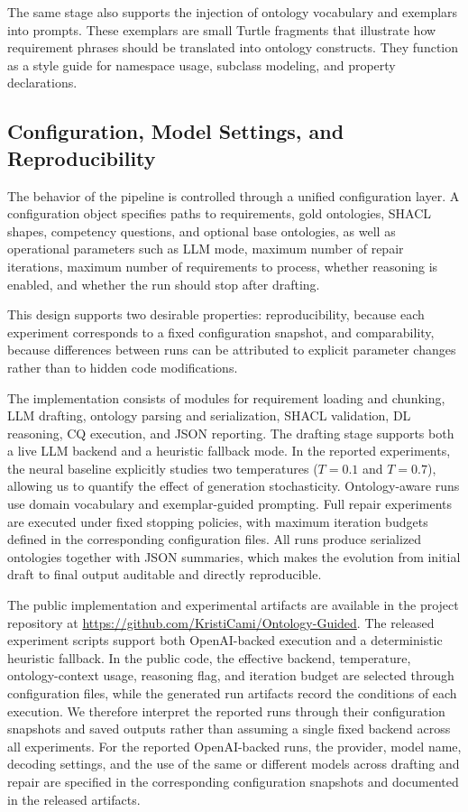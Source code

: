 The same stage also supports the injection of ontology vocabulary and exemplars into prompts. These exemplars are small Turtle fragments that illustrate how requirement phrases should be translated into ontology constructs. They function as a style guide for namespace usage, subclass modeling, and property declarations.

\subsection{Configuration, Model Settings, and Reproducibility}
The behavior of the pipeline is controlled through a unified configuration layer. A configuration object specifies paths to requirements, gold ontologies, SHACL shapes, competency questions, and optional base ontologies, as well as operational parameters such as LLM mode, maximum number of repair iterations, maximum number of requirements to process, whether reasoning is enabled, and whether the run should stop after drafting.

This design supports two desirable properties: reproducibility, because each experiment corresponds to a fixed configuration snapshot, and comparability, because differences between runs can be attributed to explicit parameter changes rather than to hidden code modifications.

The implementation consists of modules for requirement loading and chunking, LLM drafting, ontology parsing and serialization, SHACL validation, DL reasoning, CQ execution, and JSON reporting. The drafting stage supports both a live LLM backend and a heuristic fallback mode. In the reported experiments, the neural baseline explicitly studies two temperatures ($T=0.1$ and $T=0.7$), allowing us to quantify the effect of generation stochasticity. Ontology-aware runs use domain vocabulary and exemplar-guided prompting. Full repair experiments are executed under fixed stopping policies, with maximum iteration budgets defined in the corresponding configuration files. All runs produce serialized ontologies together with JSON summaries, which makes the evolution from initial draft to final output auditable and directly reproducible.

The public implementation and experimental artifacts are available in the project repository at \url{https://github.com/KristiCami/Ontology-Guided}. The released experiment scripts support both OpenAI-backed execution and a deterministic heuristic fallback. In the public code, the effective backend, temperature, ontology-context usage, reasoning flag, and iteration budget are selected through configuration files, while the generated run artifacts record the conditions of each execution. We therefore interpret the reported runs through their configuration snapshots and saved outputs rather than assuming a single fixed backend across all experiments. For the reported OpenAI-backed runs, the provider, model name, decoding settings, and the use of the same or different models across drafting and repair are specified in the corresponding configuration snapshots and documented in the released artifacts.


